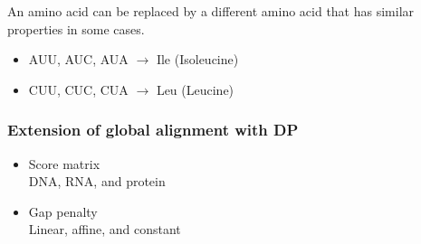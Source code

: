\noindent
An amino acid can be replaced by a different amino acid that has similar properties in some cases.
\begin{itemize}
\item AUU, AUC, AUA $\rightarrow$ Ile (Isoleucine)
\item CUU, CUC, CUA $\rightarrow$ Leu (Leucine)
\end{itemize}

%
%
\subsubsection*{Extension of global alignment with DP}

\begin{itemize}
\item Score matrix \\
DNA, RNA, and protein

\item Gap penalty \\
Linear, affine, and constant
\end{itemize}



%
